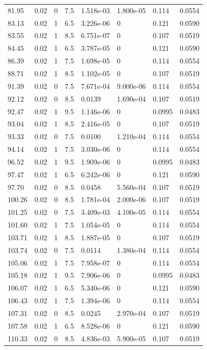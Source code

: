 \documentclass[preview]{standalone}
\begin{document}
{{{\begin{tabular}{L{1.2cm}C{1.2cm} C{0.3cm}C{0.5cm} C{1.4cm}C{1.4cm} C{1.4cm}C{1.4cm}}
  81.95  &  0.02  & 0     & 7.5 &  1.518e-03  & 1.800e-05  & 0.114 &  0.0554   \\ 
  83.13  &  0.02  & 1     & 6.5 &  3.226e-06  & 0  & 0.121 &  0.0590   \\ 
  83.55  &  0.02  & 1     & 8.5 &  6.751e-07  & 0  & 0.107 &  0.0519   \\ 
  84.45  &  0.02  & 1     & 6.5 &  3.787e-05  & 0  & 0.121 &  0.0590   \\ 
  86.39  &  0.02  & 1     & 7.5 &  1.698e-05  & 0  & 0.114 &  0.0554   \\ 
  88.71  &  0.02  & 1     & 8.5 &  1.102e-05  & 0  & 0.107 &  0.0519   \\ 
  91.39  &  0.02  & 0     & 7.5 &  7.671e-04  & 9.000e-06  & 0.114 &  0.0554   \\ 
  92.12  &  0.02  & 0     & 8.5 &  0.0139  & 1.690e-04  & 0.107 &  0.0519   \\ 
  92.47  &  0.02  & 1     & 9.5 &  1.146e-06  & 0  & 0.0995 &  0.0483   \\ 
  93.04  &  0.02  & 1     & 8.5 &  2.416e-05  & 0  & 0.107 &  0.0519   \\ 
  93.33  &  0.02  & 0     & 7.5 &  0.0100  & 1.210e-04  & 0.114 &  0.0554   \\ 
  94.14  &  0.02  & 1     & 7.5 &  3.030e-06  & 0  & 0.114 &  0.0554   \\ 
  96.52  &  0.02  & 1     & 9.5 &  1.909e-06  & 0  & 0.0995 &  0.0483   \\ 
  97.47  &  0.02  & 1     & 6.5 &  6.242e-06  & 0  & 0.121 &  0.0590   \\ 
  97.70  &  0.02  & 0     & 8.5 &  0.0458  & 5.560e-04  & 0.107 &  0.0519   \\ 
  100.26  &  0.02  & 0     & 8.5 &  1.781e-04  & 2.000e-06  & 0.107 &  0.0519   \\ 
  101.25  &  0.02  & 0     & 7.5 &  3.409e-03  & 4.100e-05  & 0.114 &  0.0554   \\ 
  101.60  &  0.02  & 1     & 7.5 &  1.054e-05  & 0  & 0.114 &  0.0554   \\ 
  103.71  &  0.02  & 1     & 8.5 &  1.887e-05  & 0  & 0.107 &  0.0519   \\ 
  103.74  &  0.02  & 0     & 7.5 &  0.0114  & 1.380e-04  & 0.114 &  0.0554   \\ 
  105.06  &  0.02  & 1     & 7.5 &  7.958e-07  & 0  & 0.114 &  0.0554   \\ 
  105.18  &  0.02  & 1     & 9.5 &  7.906e-06  & 0  & 0.0995 &  0.0483   \\ 
  106.07  &  0.02  & 1     & 6.5 &  5.340e-06  & 0  & 0.121 &  0.0590   \\ 
  106.43  &  0.02  & 1     & 7.5 &  1.394e-06  & 0  & 0.114 &  0.0554   \\ 
  107.31  &  0.02  & 0     & 8.5 &  0.0245  & 2.970e-04  & 0.107 &  0.0519   \\ 
  107.58  &  0.02  & 1     & 6.5 &  8.528e-06  & 0  & 0.121 &  0.0590   \\ 
  110.33  &  0.02  & 0     & 8.5 &  4.836e-03  & 5.900e-05  & 0.107 &  0.0519   \\ 
\hline 
\end{tabular} 

}}}
\end{document}
